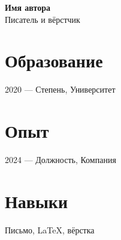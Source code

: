\documentclass[11pt]{article}
\begin{document}
{\Large\bfseries Имя автора}\\[4pt]
{\large Писатель и вёрстчик}

\vspace{8pt}

\section*{Образование}
2020 — Степень, Университет

\section*{Опыт}
2024 — Должность, Компания

\section*{Навыки}
Письмо, LaTeX, вёрстка
\end{document}
